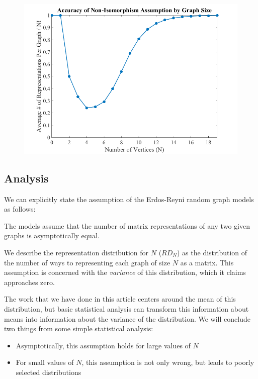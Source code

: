 \documentclass[a4paper,12pt]{article}
\begin{document}
\begin{figure}[htbp]
  \centering
  \includegraphics[scale=.45]{accuracy-of-assumption}
\end{figure}

\subsection*{Analysis}

We can explicitly state the assumption of the Erdos-Reyni random graph models as follows:
\begin{displayquote}
The models assume that the number of matrix representations of any two given graphs is asymptotically equal.
\end{displayquote}

We describe the representation distribution for \(N\) (\(RD_N\)) as the distribution of the number of ways to representing each graph of size \(N\) as a matrix.
This assumption is concerned with the \emph{variance} of this distribution, which it claims approaches zero.

The work that we have done in this article centers around the mean of this distribution, but basic statistical analysis can transform this information about means into information about the variance of the distribution. We will conclude two things from some simple statistical analysis:
\begin{itemize}
	\item{Asymptotically, this assumption holds for large values of \(N\)}
	\item{For small values of \(N\), this assumption is not only wrong, but leads to poorly selected distributions}
\end{itemize}
\end{document}
